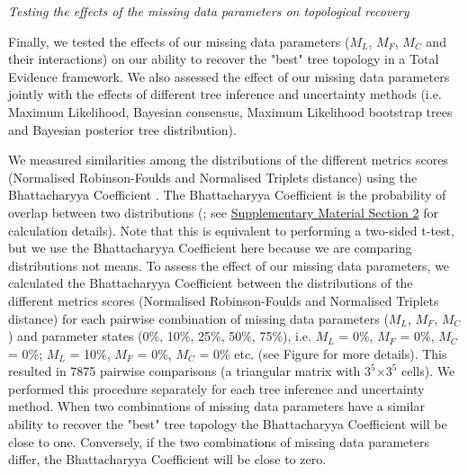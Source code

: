 \documentclass[12pt,letterpaper]{article}
\renewcommand{\subsection}[1]{%
\bigskip
\begin{center}
\begin{large}
\normalfont\itshape #1
\end{large}
\end{center}}
\begin{document}
\subsection{Testing the effects of the missing data parameters on topological recovery} %
Finally, we tested the effects of our missing data parameters ($M_{L}$, $M_{F}$, $M_{C}$ and their interactions) on our ability to recover the "best" tree topology in a Total Evidence framework. We also assessed the effect of our missing data parameters jointly with the effects of different tree inference and uncertainty methods (i.e. Maximum Likelihood, Bayesian consensus, Maximum Likelihood bootstrap trees and Bayesian posterior tree distribution).

We measured similarities among the distributions of the different metrics scores (Normalised Robinson-Foulds and Normalised Triplets distance) using the Bhattacharyya Coefficient \citep{Bhattacharyya}. The Bhattacharyya Coefficient is the probability of overlap between two distributions (\citealt{Bhattacharyya}; see \hyperref[SupplementaryMaterial]{Supplementary Material Section 2} for calculation details). Note that this is  equivalent to performing a two-sided t-test, but we use the Bhattacharyya Coefficient here because we are comparing distributions not means. To assess the effect of our missing data parameters, we calculated the Bhattacharyya Coefficient between the distributions of the different metrics scores (Normalised Robinson-Foulds and Normalised Triplets distance) for each pairwise combination of missing data parameters ($M_{L}$, $M_{F}$, $M_{C}$) and parameter states (0\%, 10\%, 25\%, 50\%, 75\%), i.e. $M_{L}$ = 0\%, $M_{F}$ = 0\%, $M_{C}$ = 0\%; $M_{L}$ = 10\%, $M_{F}$ = 0\%, $M_{C}$ = 0\% etc. (see Figure %
for more details). This resulted in 7875 pairwise comparisons (a triangular matrix with $3^5$$\times$$3^5$ cells). We performed this procedure separately for each tree inference and uncertainty method. When two combinations of missing data parameters have a similar ability to recover the "best" tree topology the Bhattacharyya Coefficient will be close to one. Conversely, if the two combinations of missing data parameters differ, the Bhattacharyya Coefficient will be close to zero.

\end{document}
